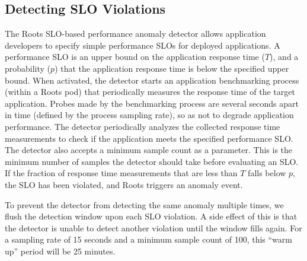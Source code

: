 \subsection{Detecting SLO Violations}

The Roots SLO-based performance anomaly detector
allows application developers to specify simple performance SLOs for deployed applications. A
performance SLO is an upper bound on the application response time ($T$), and a probability ($p$)
that the application response time is below the specified upper bound. 
When activated, the detector starts an application benchmarking process (within a Roots pod)
that periodically measures the response time of the target application. Probes made by the benchmarking 
process are several seconds apart in time (defined by the process sampling rate), 
so as not to degrade application performance.
The detector periodically
analyzes the collected response time measurements to check if the application meets the specified performance
SLO. The detector also accepts a minimum sample count as a parameter. This is the minimum number of 
samples the detector should take before evaluating an SLO.  If the fraction of response time measurements
that are
less than $T$ falls below $p$, the SLO has been violated, and Roots triggers an anomaly event.

To prevent the detector from detecting the same anomaly multiple times, we flush
the detection window upon each SLO violation. A side effect of this is that 
the detector is unable to detect
another violation until the window fills again.
For a sampling rate of 15 seconds and a minimum
sample count of 100, this ``warm up'' period will be 25 minutes.

